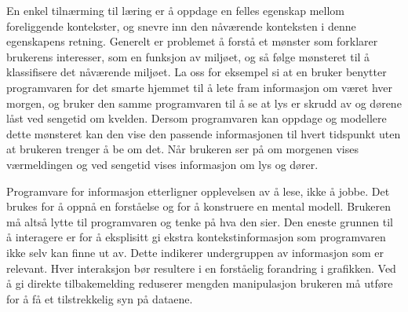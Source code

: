 En enkel tilnærming til læring er å oppdage en felles egenskap mellom foreliggende kontekster, og snevre inn den nåværende konteksten i denne egenskapens retning. Generelt er problemet å forstå et mønster som forklarer brukerens interesser, som en funksjon av miljøet, og så følge mønsteret til å klassifisere det nåværende miljøet. La oss for eksempel si at en bruker benytter programvaren for det smarte hjemmet til å lete fram informasjon om været hver morgen, og bruker den samme programvaren til å se at lys er skrudd av og dørene låst ved sengetid om kvelden. Dersom programvaren kan oppdage og modellere dette mønsteret kan den vise den passende informasjonen til hvert tidspunkt uten at brukeren trenger å be om det. Når brukeren ser på om morgenen vises værmeldingen og ved sengetid vises informasjon om lys og dører.

Programvare for informasjon etterligner opplevelsen av å lese, ikke å jobbe. Det brukes for å oppnå en forståelse og for å konstruere en mental modell. Brukeren må altså lytte til programvaren og tenke på hva den sier. Den eneste grunnen til å interagere er for å eksplisitt gi ekstra kontekstinformasjon som programvaren ikke selv kan finne ut av. Dette indikerer undergruppen av informasjon som er relevant. Hver interaksjon bør resultere i en forståelig forandring i grafikken. Ved å gi direkte tilbakemelding reduserer mengden manipulasjon brukeren må utføre for å få et tilstrekkelig syn på dataene.

